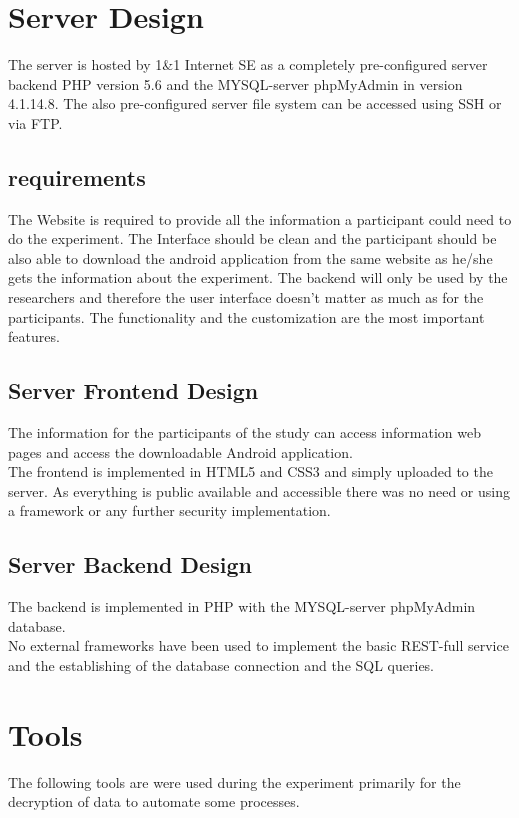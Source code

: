 \section{Server Design}
The server is hosted by 1\&1 Internet SE as a completely pre-configured server backend PHP version 5.6 and the MYSQL-server phpMyAdmin in version 4.1.14.8. The also pre-configured server file system can be accessed using SSH or via FTP.

\subsection{requirements}
The Website is required to provide all the information a participant could need to do the experiment. The Interface should be clean and the participant should be also able to download the android application from the same website as he/she gets the information about the experiment. 
The backend will only be used by the researchers and therefore the user interface doesn't matter as much as for the participants. The functionality and the customization are the most important features. 

\subsection{Server Frontend Design}
The information for the participants of the study can access information web pages and access the downloadable Android application.\\
The frontend is implemented in HTML5 and CSS3 and simply uploaded to the server. As everything is public available and accessible there was no need or using a framework or any further security implementation. 

\subsection{Server Backend Design}
The backend is implemented in PHP with the MYSQL-server phpMyAdmin database.\\ 
No external frameworks have been used to implement the basic REST-full service and the establishing of the database connection and the SQL queries.

\section{Tools}
The following tools are were used during the experiment primarily for the decryption of data to automate some processes.

